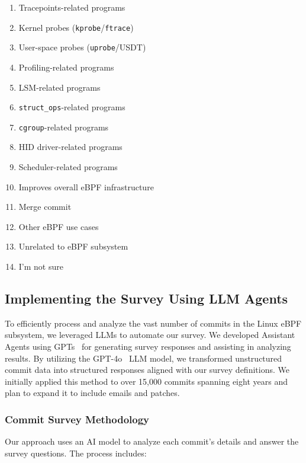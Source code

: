 \begin{enumerate}
\begin{enumerate}[label=(\alph*)]
        \item Tracepoints-related programs
        \item Kernel probes (\texttt{kprobe}/\texttt{ftrace})
        \item User-space probes (\texttt{uprobe}/USDT)
        \item Profiling-related programs
        \item LSM-related programs
        \item \texttt{struct\_ops}-related programs
        \item \texttt{cgroup}-related programs
        \item HID driver-related programs
        \item Scheduler-related programs
        \item Improves overall eBPF infrastructure
        \item Merge commit
        \item Other eBPF use cases
        \item Unrelated to eBPF subsystem
        \item I'm not sure
    \end{enumerate}
\end{enumerate}

\subsection{Implementing the Survey Using LLM Agents}

To efficiently process and analyze the vast number of commits in the Linux eBPF subsystem, we leveraged LLMs to automate our survey. We developed Assistant Agents using GPTs~\cite{gpts} for generating survey responses and assisting in analyzing results. By utilizing the GPT-4o~\cite{gpt4o} LLM model, we transformed unstructured commit data into structured responses aligned with our survey definitions. We initially applied this method to over 15,000 commits spanning eight years and plan to expand it to include emails and patches.

\subsubsection{Commit Survey Methodology}

Our approach uses an AI model to analyze each commit's details and answer the survey questions. The process includes:


